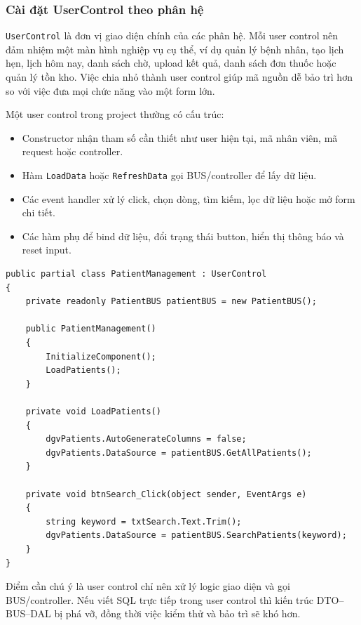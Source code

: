 \documentclass[12pt,a4paper]{article}
\numberwithin{figure}{subsection}
\numberwithin{table}{subsection}
\newcounter{codecounter}
\newenvironment{codeblock}[2]{%
    \refstepcounter{codecounter}%
    \phantomsection%
    \label{#1}%
    \par\smallskip
}{%
    \par\smallskip
}
\begin{document}
\subsubsection{Cài đặt UserControl theo phân hệ}

\texttt{UserControl} là đơn vị giao diện chính của các phân hệ. Mỗi user control nên đảm nhiệm một màn hình nghiệp vụ cụ thể, ví dụ quản lý bệnh nhân, tạo lịch hẹn, lịch hôm nay, danh sách chờ, upload kết quả, danh sách đơn thuốc hoặc quản lý tồn kho. Việc chia nhỏ thành user control giúp mã nguồn dễ bảo trì hơn so với việc đưa mọi chức năng vào một form lớn.

Một user control trong project thường có cấu trúc:

\begin{itemize}
    \item Constructor nhận tham số cần thiết như user hiện tại, mã nhân viên, mã request hoặc controller.
    \item Hàm \texttt{LoadData} hoặc \texttt{RefreshData} gọi BUS/controller để lấy dữ liệu.
    \item Các event handler xử lý click, chọn dòng, tìm kiếm, lọc dữ liệu hoặc mở form chi tiết.
    \item Các hàm phụ để bind dữ liệu, đổi trạng thái button, hiển thị thông báo và reset input.
\end{itemize}

\begin{codeblock}{code:user-control-pattern}{Mẫu tổ chức UserControl nghiệp vụ}
\begin{verbatim}
public partial class PatientManagement : UserControl
{
    private readonly PatientBUS patientBUS = new PatientBUS();

    public PatientManagement()
    {
        InitializeComponent();
        LoadPatients();
    }

    private void LoadPatients()
    {
        dgvPatients.AutoGenerateColumns = false;
        dgvPatients.DataSource = patientBUS.GetAllPatients();
    }

    private void btnSearch_Click(object sender, EventArgs e)
    {
        string keyword = txtSearch.Text.Trim();
        dgvPatients.DataSource = patientBUS.SearchPatients(keyword);
    }
}
\end{verbatim}
\end{codeblock}

Điểm cần chú ý là user control chỉ nên xử lý logic giao diện và gọi BUS/controller. Nếu viết SQL trực tiếp trong user control thì kiến trúc DTO--BUS--DAL bị phá vỡ, đồng thời việc kiểm thử và bảo trì sẽ khó hơn.
\end{document}
